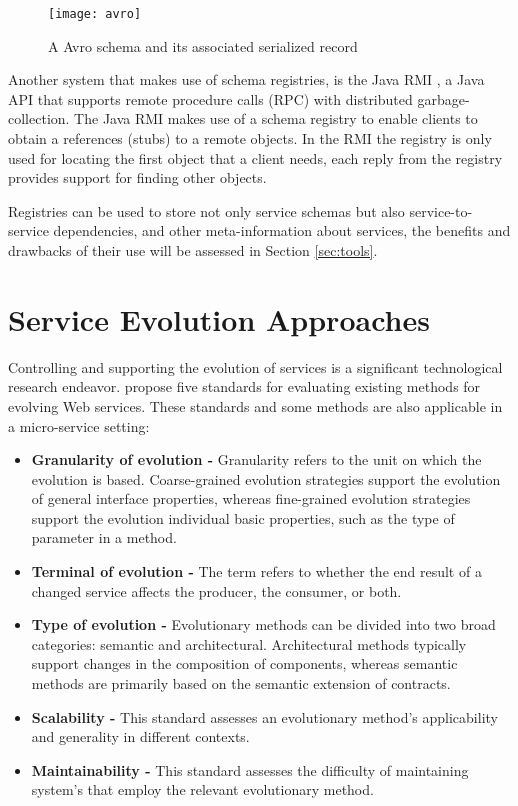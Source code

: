 \begin{figure}[htbp]
    \centering
    \texttt{[image: avro]}
    \caption{A Avro schema and its associated serialized record }
    \label{fig:avro}
\end{figure}

Another system that makes use of schema registries, is the Java RMI \cite{12},
a Java API that supports remote procedure calls (RPC) with distributed garbage-collection.
The Java RMI makes use of a schema registry to enable clients to obtain a references (stubs) to a remote objects.
In the RMI the registry is only used for locating the first object that a client needs, each reply from the registry provides
support for finding other objects.

Registries can be used to store not only service schemas but also service-to-service dependencies, and other meta-information about services, the benefits and drawbacks of their use will be
assessed in Section \ref{sec:tools}.

\section{Service Evolution Approaches} %
\label{sec:service_evolution_approaches}

Controlling and supporting the evolution of services is a significant technological research endeavor.
\citeauthor{webServiceEvolution} \cite{webServiceEvolution} propose five standards for evaluating existing methods for evolving Web services.
These standards and some methods are also applicable in a micro-service setting:
\begin{itemize}
    \item \textbf{Granularity of evolution -} Granularity refers to the unit on which the evolution is based.
    Coarse-grained evolution strategies support the evolution of general interface properties,
    whereas fine-grained evolution strategies support the evolution individual basic properties, such as the type of parameter in a method.
    \item \textbf{Terminal of evolution -} The term refers to whether the end result of a changed service affects the producer, the consumer, or both.
    \item \textbf{Type of evolution -} Evolutionary methods can be divided into two broad categories: semantic and architectural.
    Architectural methods typically support changes in the composition of components, whereas semantic methods are primarily based on the semantic extension of contracts.
    \item \textbf{Scalability -} This standard assesses an evolutionary method's applicability and generality in different contexts.
    \item \textbf{Maintainability -} This standard assesses the difficulty of maintaining system's that employ the relevant evolutionary method.
\end{itemize}


